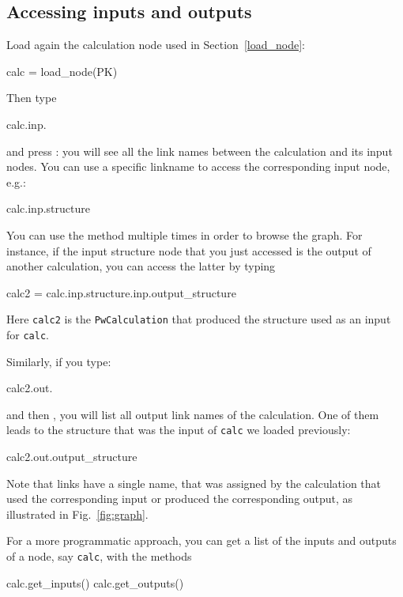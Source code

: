 
\subsection{Accessing inputs and outputs}

Load again the calculation node used in Section~\ref{load_node}:
\begin{pythoncommand}
 calc = load_node(PK)
\end{pythoncommand}
Then type
\begin{pythoncommand}
 calc.inp.
\end{pythoncommand}
and press : you will see all the link names between the
calculation and its input nodes. You can use a specific linkname to access the
corresponding input node, e.g.:
\begin{pythoncommand}
 calc.inp.structure
\end{pythoncommand}

You can use the  method multiple times in order to browse the graph. For instance, 
if the input structure node that you just accessed is the output of another calculation, you can access the latter by typing

\begin{pythoncommand}
 calc2 = calc.inp.structure.inp.output_structure
\end{pythoncommand}
Here \texttt{calc2} is the \texttt{PwCalculation} that produced the structure used as an input for \texttt{calc}.

Similarly, if you type:
\begin{pythoncommand}
 calc2.out.
\end{pythoncommand}
and then , you will list all output link names of the calculation.
One of them leads to the structure that was the input of \texttt{calc} we loaded
previously:
\begin{pythoncommand}
 calc2.out.output_structure
\end{pythoncommand}
Note that links have a single name, that was assigned by the
calculation that used the corresponding input or produced the corresponding
output, as illustrated in Fig.~\ref{fig:graph}.

For a more programmatic approach, you can get a list of the inputs and outputs of a node, say \texttt{calc}, with the methods
\begin{pythoncommand}
 calc.get_inputs()
 calc.get_outputs()
\end{pythoncommand}

